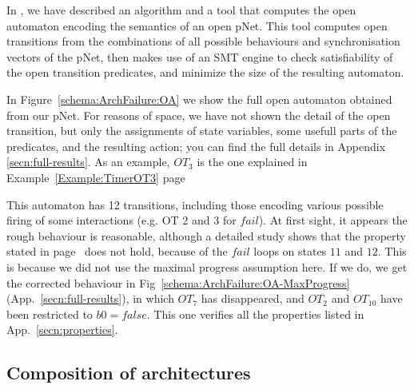 \documentclass{llncs}
\newcommand{\todoEM}[2][color=green!40, size=\tiny]{\todo[#1]{\textbf{To-do Eric:} {#2}}}
\newcommand{\app}[1]{App.~\ref{secn:#1}}
\begin{document}
In \cite{HMZ-FORTE2016QBMZ-AVOCS18}, we have described an algorithm
and a tool that 
computes the open automaton encoding the semantics of an open
pNet. This tool computes open transitions from the combinations of all
possible behaviours and synchronisation vectors of the pNet, then makes
use of an SMT engine to check satisfiability of the open transition
predicates, and minimize the size of the resulting automaton.



In Figure~\ref{schema:ArchFailure:OA} we show the full open automaton
obtained from our pNet. For reasons of space, we have not shown the
detail of the open transition, but only the assignments of state
variables, some usefull parts of the predicates, and the resulting
action; you can find the full details in 
Appendix \ref{secn:full-results}. As an example, $OT_3$ is the one
explained in Example~\ref{Example:TimerOT3} page~\pageref{Example:TimerOT3}

This automaton has 12 transitions, including those encoding various
possible firing of some interactions (e.g. OT 2 and 3 for
$fail$). At first sight, it appears the rough behaviour is
reasonable, although a detailed study shows that the property stated
in page~\pageref{property:reset} does not hold, because of the
$fail$ loops on states $11$ and $12$. This is because we did not use
the maximal progress assumption here. If we do, we get the corrected
behaviour in Fig~\ref{schema:ArchFailure:OA-MaxProgress}
(\app{full-results}), in which $OT_7$ has 
disappeared, and $OT_2$ and $OT_{10}$ have been restricted to
$b0=false$. This one verifies all the properties listed in
\app{properties}. 



\subsection{Composition of architectures}
\label{secn:arch:composition}
\end{document}
